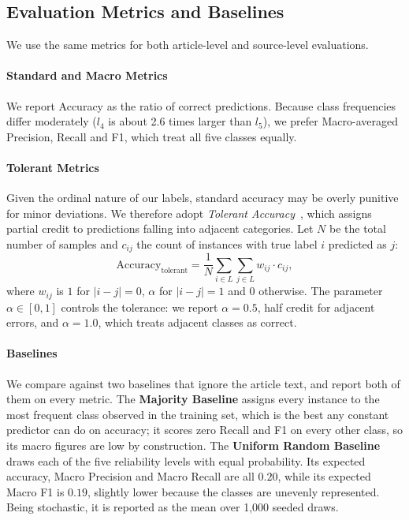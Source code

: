 \documentclass[runningheads]{llncs}
\begin{document}
\subsection{Evaluation Metrics and Baselines}\label{subsection:metrics}
We use the same metrics for both article-level and source-level evaluations.

\paragraph{Standard and Macro Metrics} We report Accuracy as the ratio of correct predictions. Because class frequencies differ moderately ($l_4$ is about 2.6 times larger than $l_5$), we prefer Macro-averaged Precision, Recall and F1, which treat all five classes equally.

\paragraph{Tolerant Metrics}
Given the ordinal nature of our labels, standard accuracy may be overly punitive for minor deviations. We therefore adopt \textit{Tolerant Accuracy}~\cite{wconf}, which assigns partial credit to predictions falling into adjacent categories. Let $N$ be the total number of samples and $c_{ij}$ the count of instances with true label $i$ predicted as $j$:
\begin{equation}
\mathrm{Accuracy}_{\mathrm{tolerant}}
= \frac{1}{N} \sum_{i \in L} \sum_{j \in L} w_{ij} \cdot c_{ij},
\label{eq:tolerant_accuracy}
\end{equation}
where $w_{ij}$ is $1$ for $|i-j|=0$, $\alpha$ for $|i-j|=1$ and $0$ otherwise. The parameter $\alpha \in [0,1]$ controls the tolerance: we report \(\alpha=0.5\), half credit for adjacent errors, and \(\alpha=1.0\), which treats adjacent classes as correct.


\paragraph{Baselines} We compare against two baselines that ignore the article text, and report both of them on every metric. The \textbf{Majority Baseline} assigns every instance to the most frequent class observed in the training set, which is the best any constant predictor can do on accuracy; it scores zero Recall and F1 on every other class, so its macro figures are low by construction. The \textbf{Uniform Random Baseline} draws each of the five reliability levels with equal probability. Its expected accuracy, Macro Precision and Macro Recall are all $0.20$, while its expected Macro F1 is $0.19$, slightly lower because the classes are unevenly represented. Being stochastic, it is reported as the mean over 1{,}000 seeded draws.
\end{document}
